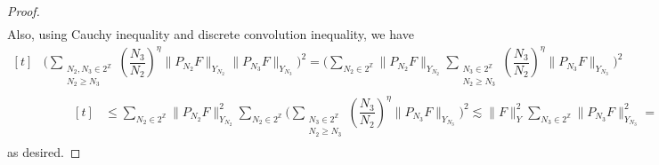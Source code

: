 \documentclass[aihp]{imsart}
\numberwithin{equation}{section}
\theoremstyle{plain}
\theoremstyle{remark}
\newcommand{\Z}{\mathbb{Z}}
\begin{document}
\begin{proof}
\begin{align*}
\end{align*}
Also, using Cauchy inequality and discrete convolution inequality, we have 
\begin{equation*}
\begin{aligned}[t]
& \Bigg( \sum_{\substack{N_2, N_3 \in 2^\Z \\ N_2 \geq  N_3}} \left(\dfrac{N_3}{N_2}\right)^{\eta}  \|P_{N_2}F\|_{Y_{N_2}} \|P_{N_3}F\|_{Y_{N_3}} \Bigg)^2 =\Bigg(\sum_{N_2\in 2^\Z} \|P_{N_2}F\|_{Y_{N_2}}  \sum_{\substack{ N_3 \in 2^\Z \\ N_2 \geq  N_3}} \left(\dfrac{N_3}{N_2}\right)^{\eta}  \|P_{N_3}F\|_{Y_{N_3}} \Bigg)^2 \\
&\qquad \begin{aligned}[t]
&\leq \sum_{N_2\in 2^\Z} \|P_{N_2}F\|_{Y_{N_2}}^2 \sum_{N_2\in 2^\Z} \Bigg(\sum_{\substack{N_3 \in 2^\Z \\ N_2 \geq  N_3}} \left(\dfrac{N_3}{N_2}\right)^{\eta}  \|P_{N_3}F\|_{Y_{N_3}} \Bigg)^2 \lesssim \|F\|_Y^2 \sum_{N_3\in 2^\Z}\|P_{N_3}F\|_{Y_{N_3}} ^2 = \|F\|_Y^4 ,
\end{aligned}
\end{aligned}
\end{equation*}
as desired. 
\end{proof}
\end{document}
